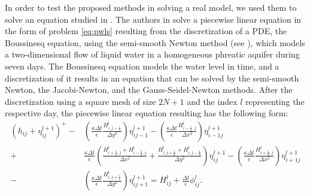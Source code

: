 \documentclass[11pt]{article}
\begin{document}
In order to test the proposed methods in solving a real model, we used them to solve an equation studied in \cite{Brugnano2008}. The authors in \cite{Brugnano2008} solve a piecewise linear equation in the form of problem \eqref{eq:pwls} resulting from the discretization of a PDE, the Boussinesq equation, using the semi-smooth Newton method (see \cite{bear1988modeling}), which models a two-dimensional flow of liquid water in a homogeneous phreatic aquifer during seven days. The Boussinesq equation models the water level in time, and a discretization of it results in an equation that can be solved by the semi-smooth Newton, the Jacobi-Newton, and the Gauss-Seidel-Newton methods. After the discretization using a square mesh of size $2N+1$ and the index $l$ representing the respective day, the piecewise linear equation resulting has the following form:
\begin{align}\nonumber
(h_{ij}+\eta_{ij}^{l+1})^+ -& \left(\frac{\kappa \Delta t}{\epsilon}\frac{H_{i,j-\frac{1}{2}}^l}{\Delta y^2}\right)\eta_{ij-1}^{l+1} - \left(\frac{\kappa \Delta t}{\epsilon}\frac{H_{i-\frac{1}{2},j}^l}{\Delta x^2}\right)\eta_{i-1j}^{l+1} \\ \nonumber
+& \frac{\kappa \Delta t}{\epsilon}\left( \frac{H_{i+\frac{1}{2},j}^l+H_{i-\frac{1}{2},j}^l}{\Delta x^2} + \frac{H_{i,j+\frac{1}{2}}^l+H_{i,j-\frac{1}{2}}^l}{\Delta y^2} \right) \eta_{ij}^{l+1} - \left(\frac{\kappa \Delta t}{\epsilon}\frac{H_{i+\frac{1}{2},j}^l}{\Delta x^2}\right)\eta_{i+1j}^{l+1}\\
-& \left(\frac{\kappa \Delta t}{\epsilon}\frac{H_{i,j+\frac{1}{2}}^l}{\Delta y^2}\right)\eta_{ij+1}^{l+1} = H_{ij}^l + \frac{\Delta t}{\epsilon}\phi_{ij}^l. \label{discretization}
\end{align}
\end{document}
